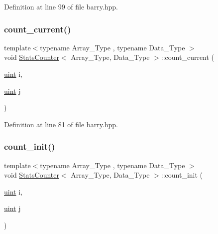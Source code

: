 Definition at line 99 of file barry.\+hpp.

\mbox{\label{classbarry_1_1_stats_counter_ab81166f7cb67eeaecc469016d237019a}} 
\subsubsection{\texorpdfstring{count\+\_\+current()}{count\_current()}}
{\footnotesize\ttfamily template$<$typename Array\+\_\+\+Type , typename Data\+\_\+\+Type $>$ \\
void \hyperlink{classbarry_1_1_stats_counter}{Stats\+Counter}$<$ Array\+\_\+\+Type, Data\+\_\+\+Type $>$\+::count\+\_\+current (\begin{DoxyParamCaption}\item[{\hyperlink{namespacebarry_a11dfc53ddb4672278319aa04f1e09a6c}{uint}}]{i,  }\item[{\hyperlink{namespacebarry_a11dfc53ddb4672278319aa04f1e09a6c}{uint}}]{j }\end{DoxyParamCaption})\hspace{0.3cm}{\ttfamily [inline]}}



Definition at line 81 of file barry.\+hpp.

\mbox{\label{classbarry_1_1_stats_counter_a19bd5936619e190c0d8918b4f343922e}} 
\subsubsection{\texorpdfstring{count\+\_\+init()}{count\_init()}}
{\footnotesize\ttfamily template$<$typename Array\+\_\+\+Type , typename Data\+\_\+\+Type $>$ \\
void \hyperlink{classbarry_1_1_stats_counter}{Stats\+Counter}$<$ Array\+\_\+\+Type, Data\+\_\+\+Type $>$\+::count\+\_\+init (\begin{DoxyParamCaption}\item[{\hyperlink{namespacebarry_a11dfc53ddb4672278319aa04f1e09a6c}{uint}}]{i,  }\item[{\hyperlink{namespacebarry_a11dfc53ddb4672278319aa04f1e09a6c}{uint}}]{j }\end{DoxyParamCaption})\hspace{0.3cm}{\ttfamily [inline]}}



